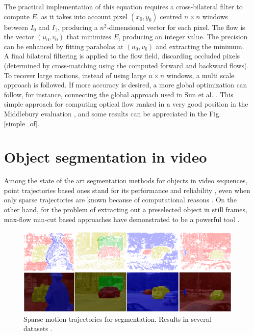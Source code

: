 The practical implementation of this equation requires a cross-bilateral filter to compute $E$, as it takes into account 
pixel $(x_0,y_0)$ centred $n \times n$ windows between $I_0$ and $I_1$, producing a $n^2$-dimensional vector for each pixel. 
The flow is the vector $(u_0, v_0)$ that minimizes $E$, producing an integer value. The precision can be enhanced by fitting 
parabolas at  $(u_0, v_0)$ and extracting the minimum. A final bilateral filtering is applied to the flow field, discarding 
occluded pixels (determined by cross-matching using the computed forward and backward flows). 
To recover large motions, instead of using large $n \times n$ windows, a multi scale approach is followed. 
If more accuracy is desired, a more global optimization can follow, for instance, connecting the global approach used in Sun et al. \cite{c40}.
This simple approach for computing optical flow ranked in a very good position in the Middlebury evaluation \cite{c17}, 
and some results can be appreciated in the Fig. \ref{simple_of}.

\section{Object segmentation in video}

Among the state of the art segmentation methods for objects in video
sequences, point trajectories based ones stand for its performance and 
reliability \cite{c33}, even when only sparse trajectories are known because of
computational reasons \cite{c34}. On the other hand, for the problem of extracting out a 
preselected object in still frames, max-flow min-cut based approaches 
have demonstrated to be a powerful tool \cite{c14}\cite{c18}. 

   \begin{figure}[thpb]
      \centering
      \includegraphics[height=0.28\textheight]{../images/point_traj_segm.png}
      \caption{  Sparse motion trajectories for segmentation. Results in several datasets  \cite{c34}. }
      \label{pt_segment}
   \end{figure}


